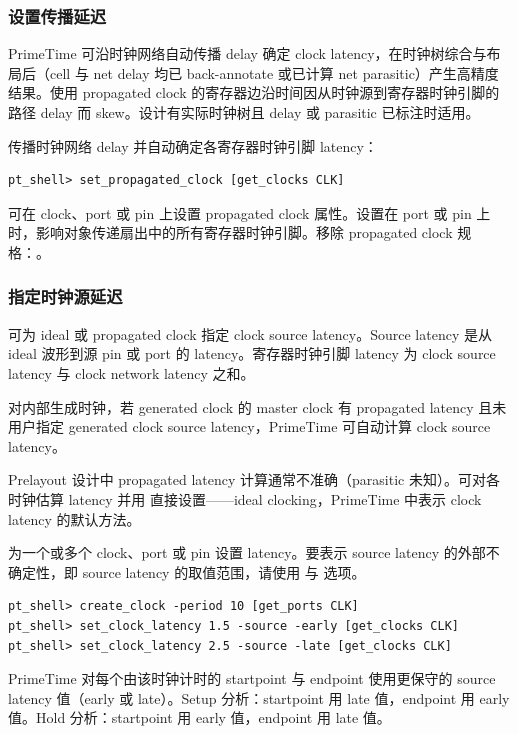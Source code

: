 \subsubsection{设置传播延迟}
PrimeTime 可沿时钟网络自动传播 delay 确定 clock latency，在时钟树综合与布局后（cell 与 net delay 均已 back-annotate 或已计算 net parasitic）产生高精度结果。使用 propagated clock 的寄存器边沿时间因从时钟源到寄存器时钟引脚的路径 delay 而 skew。设计有实际时钟树且 delay 或 parasitic 已标注时适用。

传播时钟网络 delay 并自动确定各寄存器时钟引脚 latency：
\begin{lstlisting}
pt_shell> set_propagated_clock [get_clocks CLK]
\end{lstlisting}

可在 clock、port 或 pin 上设置 propagated clock 属性。设置在 port 或 pin 上时，影响对象传递扇出中的所有寄存器时钟引脚。移除 propagated clock 规格：。

\subsubsection{指定时钟源延迟}
可为 ideal 或 propagated clock 指定 clock source latency。Source latency 是从 ideal 波形到源 pin 或 port 的 latency。寄存器时钟引脚 latency 为 clock source latency 与 clock network latency 之和。

对内部生成时钟，若 generated clock 的 master clock 有 propagated latency 且未用户指定 generated clock source latency，PrimeTime 可自动计算 clock source latency。

Prelayout 设计中 propagated latency 计算通常不准确（parasitic 未知）。可对各时钟估算 latency 并用  直接设置——ideal clocking，PrimeTime 中表示 clock latency 的默认方法。

 为一个或多个 clock、port 或 pin 设置 latency。要表示 source latency 的外部不确定性，即 source latency 的取值范围，请使用  与  选项。


\begin{lstlisting}
pt_shell> create_clock -period 10 [get_ports CLK]
pt_shell> set_clock_latency 1.5 -source -early [get_clocks CLK]
pt_shell> set_clock_latency 2.5 -source -late [get_clocks CLK]
\end{lstlisting}

PrimeTime 对每个由该时钟计时的 startpoint 与 endpoint 使用更保守的 source latency 值（early 或 late）。Setup 分析：startpoint 用 late 值，endpoint 用 early 值。Hold 分析：startpoint 用 early 值，endpoint 用 late 值。

